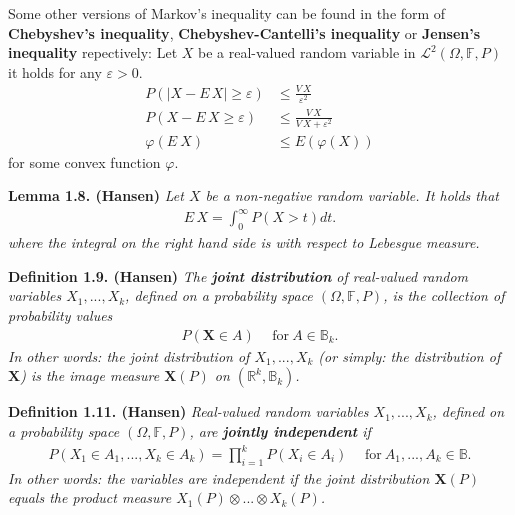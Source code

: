 \documentclass[
]{book}
\begin{document}
Some other versions of Markov's inequality can be found in the form of \textbf{Chebyshev's inequality}, \textbf{Chebyshev-Cantelli's inequality} or \textbf{Jensen's inequality} repectively: Let \(X\) be a real-valued random variable in \(\mathcal{L}^2(\Omega,\mathbb{F},P)\) it holds for any \(\varepsilon>0\).
\begin{align*}
    P\left(\vert X-E\, X\vert \ge \varepsilon\right)&\le \frac{V\, X}{\varepsilon^2}\tag{1.15}\\
    P\left( X-E\, X \ge \varepsilon\right)&\le \frac{V\, X}{V\, X+\varepsilon^2}\tag{prob: 1.13(c)}\\
    \varphi\left(E\ X\right)&\le E\left( \varphi(X)\right)
\end{align*}
for some convex function \(\varphi\).

\textbf{Lemma 1.8. (Hansen)} \emph{Let \(X\) be a non-negative random variable. It holds that}
\begin{align*}
    E\, X=\int_0^\infty P(X>t)dt.\tag{1.16}
\end{align*}
\emph{where the integral on the right hand side is with respect to Lebesgue measure.}

\textbf{Definition 1.9. (Hansen)} \emph{The \textbf{joint distribution} of real-valued random variables \(X_1,...,X_k\), defined on a probability space \((\Omega, \mathbb{F},P)\), is the collection of probability values}
\begin{align*}
    P(\mathbf{X}\in A)\hspace{15pt}\text{for}\ A\in\mathbb{B}_k.\tag{1.21}
\end{align*}
\emph{In other words: the joint distribution of \(X_1,...,X_k\) (or simply: the distribution of \(\mathbf{X}\)) is the image measure \(\mathbf{X}(P)\) on \(\left(\mathbb{R}^k,\mathbb{B}_k\right)\).}

\textbf{Definition 1.11. (Hansen)} \emph{Real-valued random variables \(X_1,...,X_k\), defined on a probability space \((\Omega, \mathbb{F},P)\), are \textbf{jointly independent} if}
\begin{align*}
    P\left(X_1\in A_1,...,X_k\in A_k\right)=\prod_{i=1}^kP(X_i\in A_i)\hspace{15pt}\text{for}\ A_1,...,A_k\in\mathbb{B}.\tag{1.23}
\end{align*}
\emph{In other words: the variables are independent if the joint distribution \(\mathbf{X}(P)\) equals the product measure \(X_1(P)\otimes ... \otimes X_k(P)\).}
\end{document}
